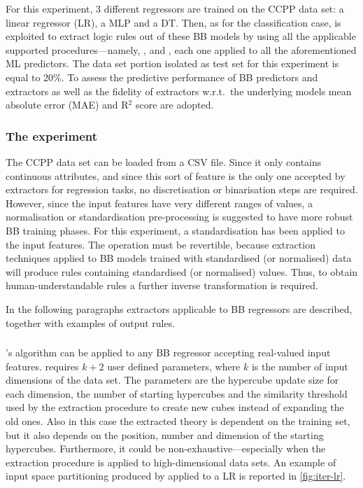 \documentclass[12pt,a4paper,openright,twoside]{book}
\begin{document}
For this experiment, 3 different regressors are trained on the CCPP data set: a linear regressor (LR), a MLP and a DT.
%
Then, as for the classification case, \psyke{} is exploited to extract logic rules out of these BB models by using all the applicable supported procedures---namely, \iter{}, \gridex{} and \cart{}, each one applied to all the aforementioned ML predictors.
%
The data set portion isolated as test set for this experiment is equal to 20\%.
%
To assess the predictive performance of BB predictors and extractors as well as the fidelity of extractors w.r.t.\ the underlying models mean absolute error (MAE) and R$^2$ score are adopted.

\subsubsection{The experiment}

The CCPP data set can be loaded from a CSV file.
%
Since it only contains continuous attributes, and since this sort of feature is the only one accepted by \psyke{} extractors for regression tasks, no discretisation or binarisation steps are required.
%
However, since the input features have very different ranges of values, a normalisation or standardisation pre-processing is suggested to have more robust BB training phases.
%
For this experiment, a standardisation has been applied to the input features.
%
The operation must be revertible, because extraction techniques applied to BB models trained with standardised (or normalised) data will produce rules containing standardised (or normalised) values.
%
Thus, to obtain human-understandable rules a further inverse transformation is required.

In the following paragraphs \psyke{} extractors applicable to BB regressors are described, together with examples of output rules.

\subsubsection{\iter{}}

\psyke{}'s \iter{} algorithm can be applied to any BB regressor accepting real-valued input features.
%
\iter{} requires $k + 2$ user defined parameters, where $k$ is the number of input dimensions of the data set.
%
The parameters are the hypercube update size for each dimension, the number of starting hypercubes and the similarity threshold used by the extraction procedure to create new cubes instead of expanding the old ones.
%
Also in this case the extracted theory is dependent on the training set, but it also depends on the position, number and dimension of the starting hypercubes.
%
Furthermore, it could be non-exhaustive---especially when the extraction procedure is applied to high-dimensional data sets.
%
An example of input space partitioning produced by \iter{} applied to a LR is reported in \cref{fig:iter-lr}.
\end{document}
